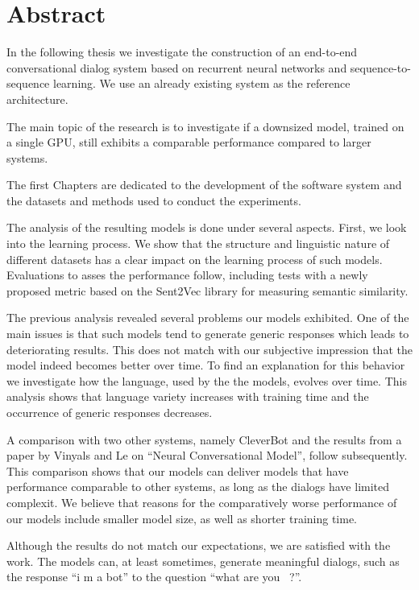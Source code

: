\chapter*{Abstract}
In the following thesis we investigate the construction of an end-to-end conversational dialog system based on recurrent neural networks and sequence-to-sequence learning. We use an already existing system as the reference architecture. 

The main topic of the research is to investigate if a downsized model, trained on a single GPU, still exhibits a comparable performance compared to larger systems.

The first Chapters are dedicated to the development of the software system and the datasets and methods used to conduct the experiments.

The analysis of the resulting models is done under several aspects. First, we look into the learning process. We show that the structure and linguistic nature of different datasets has a clear impact on the learning process of such models. Evaluations to asses the performance follow, including tests with a newly proposed metric based on the Sent2Vec library for measuring semantic similarity.

The previous analysis revealed several problems our models exhibited. One of the main issues is that such models tend to generate generic responses which leads to deteriorating results. This does not match with our subjective impression that the model indeed becomes better over time. To find an explanation for this behavior we investigate how the language, used by the the models, evolves over time. This analysis shows that language variety increases with training time and the occurrence of generic responses decreases.

A comparison with two other systems, namely CleverBot and the results from a paper by Vinyals and Le on ``Neural Conversational Model''\cite{Vinyals:2015}, follow subsequently. This comparison shows that our models can deliver models that have performance comparable to other systems, as long as the dialogs have limited complexit. We believe that reasons for the comparatively worse performance of our models include smaller model size, as well as shorter training time.

Although the results do not match our expectations, we are satisfied with the work. The models can, at least sometimes, generate meaningful dialogs, such as the response ``i m a bot'' to the question ``what are you~ ?''.

